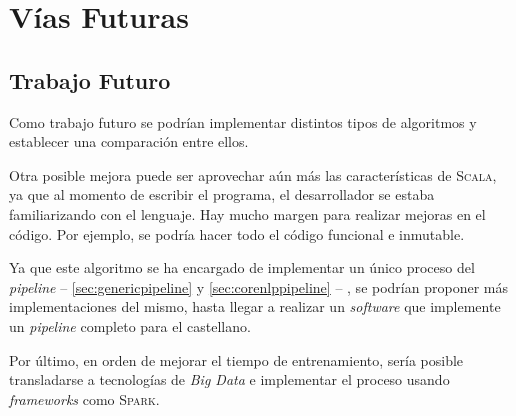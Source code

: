 \chapter{Vías Futuras}
\label{ch:future}

\section{Trabajo Futuro}
\label{sec:future}

Como trabajo futuro se podrían implementar distintos tipos de algoritmos y
establecer una comparación entre ellos.

Otra posible mejora puede ser aprovechar aún más las características de
\textsc{Scala}, ya que al momento de escribir el programa, el desarrollador se
estaba familiarizando con el lenguaje. Hay mucho margen para realizar mejoras en
el código. Por ejemplo, se podría hacer todo el código funcional e
inmutable.

Ya que este algoritmo se ha encargado de implementar un único proceso del
\emph{pipeline} -- \autoref{sec:genericpipeline} y \autoref{sec:corenlppipeline}
-- , se podrían proponer más implementaciones del mismo, hasta llegar a realizar
un \emph{software} que implemente un \emph{pipeline} completo para el
castellano.

Por último, en orden de mejorar el tiempo de entrenamiento, sería posible
transladarse a tecnologías de \emph{Big Data} e implementar el proceso usando
\emph{frameworks} como \textsc{Spark}.

